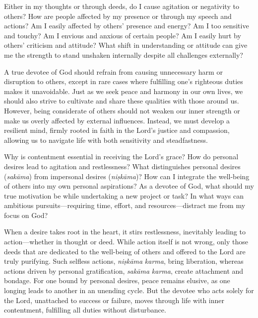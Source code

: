 \newpage
\begin{mananam}{}
\normalfont\mananamtext Either in my thoughts or through deeds, do I cause agitation or negativity to others? How are people affected by my presence or through my speech and actions?
Am I easily affected by others’ presence and energy? Am I too sensitive and touchy? Am I envious and anxious of certain people? Am I easily hurt by others’ criticism and attitude? What shift in understanding or attitude can give me the strength to stand unshaken internally despite all challenges externally?
\end{mananam}
\sreflect
\begin{inspiration}{}
\normalfont\mananamtext A true devotee of God should refrain from causing unnecessary harm or disruption to others, except in rare cases where fulfilling one’s righteous duties makes it unavoidable. Just as we seek peace and harmony in our own lives, we should also strive to cultivate and share these qualities with those around us.
However, being considerate of others should not weaken our inner strength or make us overly affected by external influences. Instead, we must develop a resilient mind, firmly rooted in faith in the Lord’s justice and compassion, allowing us to navigate life with both sensitivity and steadfastness.
\end{inspiration}
\newpage

\begin{mananam}{}
\normalfont\mananamtext Why is contentment essential in receiving the Lord’s grace? How do personal desires lead to agitation and restlessness? 
What distinguishes personal desires (\emph{sakāma}) from impersonal desires (\emph{niṣkāma})? How can I integrate the well-being of others into my own personal aspirations? 
As a devotee of God, what should my true motivation be while undertaking a new project or task? In what ways can ambitious pursuits—requiring time, effort, and resources—distract me from my focus on God?
\end{mananam}
\sreflect
\begin{inspiration}{}
\normalfont\mananamtext When a desire takes root in the heart, it stirs restlessness, inevitably leading to action—whether in thought or deed. While action itself is not wrong, only those deeds that are dedicated to the well-being of others and offered to the Lord are truly purifying. Such selfless actions, \emph{niṣkāma} \emph{karma}, bring liberation, whereas actions driven by personal gratification, \emph{sakāma} \emph{karma}, create attachment and bondage.
For one bound by personal desires, peace remains elusive, as one longing leads to another in an unending cycle. But the devotee who acts solely for the Lord, unattached to success or failure, moves through life with inner contentment, fulfilling all duties without disturbance.
\end{inspiration}
\newpage

